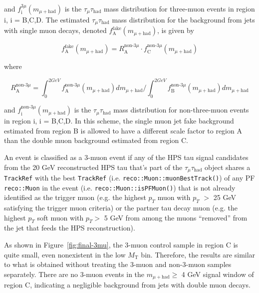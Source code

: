 and $f_{\text{i}}^{3\mu}(m_{\mu+\text{had}})$ is the $\tau_{\mu}\tau_{\text{had}}$ mass distribution for three-muon events in region i, i = B,C,D.  The estimated $\tau_{\mu}\tau_{\text{had}}$ mass distribution for the background from jets with single muon decays, denoted $f_{\text{A}}^{\text{fake}}(m_{\mu+\text{had}})$, is given by

\begin{equation}
\label{eq:f-A-non-3mu}
f_{\text{A}}^{\text{fake}}(m_{\mu+\text{had}}) = R_{\text{A}}^{\text{non-}3\mu}\cdot f_{\text{C}}^{\text{non-}3\mu}(m_{\mu+\text{had}})
\end{equation}

where

\begin{equation}
\label{eq:R-A-non-3mu}
R_{\text{A}}^{\text{non-}3\mu} = \int_{0}^{2 GeV}f_{\text{A}}^{\text{non-}3\mu}(m_{\mu+\text{had}})dm_{\mu+\text{had}}/\int_{0}^{2 GeV}f_{\text{B}}^{\text{non-}3\mu}(m_{\mu+\text{had}})dm_{\mu+\text{had}}
\end{equation}

and $f_{\text{i}}^{\text{non-}3\mu}(m_{\mu+\text{had}})$ is the $\tau_{\mu}\tau_{\text{had}}$ mass distribution for non-three-muon events in region i, i = B,C,D.  In this scheme, the single muon jet fake background estimated from region B is allowed to have a different scale factor to region A than the double muon background estimated from region C.

An event is classified as a 3-muon event if any of the HPS tau signal candidates from the 20 GeV reconstructed HPS tau that's part of the $\tau_{\mu}\tau_{\text{had}}$ object shares a \texttt{TrackRef} with the best \texttt{TrackRef} (i.e. \texttt{reco::Muon::muonBestTrack()}) of any PF \texttt{reco::Muon} in the event (i.e. \texttt{reco::Muon::isPFMuon()}) that is not already identified as the trigger muon (e.g. the highest $p_T$ muon with $p_T$ $>$ 25 GeV satisfying the trigger muon criteria) or the partner tau decay muon (e.g. the highest $p_T$ soft muon with $p_T >$ 5 GeV from among the muons ``removed'' from the jet that feeds the HPS reconstruction).

As shown in Figure~\ref{fig:final-3mu}, the 3-muon control sample in region C is quite small, even nonexistent in the low $M_{\text{T}}$ bin.  Therefore, the results are similar to what is obtained without treating the 3-muon and non-3-muon samples separately.  There are no 3-muon events in the $m_{\mu+\text{had}} \geq$ 4 GeV signal window of region C, indicating a negligible background from jets with double muon decays.

